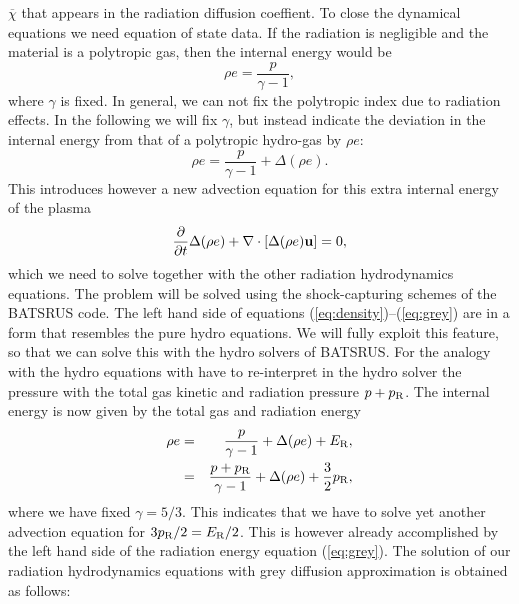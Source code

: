 \documentclass[12pt]{article}
\begin{document}
$\overline{\chi}$ that appears in the radiation diffusion coeffient.  
To close the dynamical equations we need equation of state data. 
If the radiation is negligible and the material is a polytropic gas, 
then the internal energy would be 
\begin{equation} 
\rho e = \frac{p}{\gamma - 1}, 
\end{equation} 
where $\gamma$ is fixed. In general, we can not fix the polytropic index due 
to radiation effects. In the following we will fix $\gamma$, but instead  
indicate the deviation in the internal energy from that of a polytropic 
hydro-gas by $\rho e$: 
\begin{equation} 
\rho e = \frac{p}{\gamma - 1} + \Delta (\rho e). 
\end{equation} 
This introduces however a new advection equation for this extra internal 
energy of the plasma 
\begin{equation} 
\frac{\partial}{\partial t} \Delta(\rho e) + \nabla\cdot\left[  
\Delta(\rho e) {\bf u} \right] = 0, 
\end{equation} 
which we need to solve together with the other radiation hydrodynamics 
equations.  The problem will be solved using the shock-capturing schemes of 
the BATSRUS code. The left hand side of equations 
(\ref{eq:density})--(\ref{eq:grey}) are in a form that resembles the pure 
hydro equations. We will fully exploit this feature, so that we can solve 
this with the hydro solvers of BATSRUS. For the analogy with the hydro 
equations with have to re-interpret in the hydro solver the pressure with 
the total gas kinetic and radiation pressure $p+p_{\rm R}$. The internal 
energy is now given by the total gas and radiation energy 
\begin{eqnarray} \rho e &=& \frac{p}{\gamma - 1} + \Delta (\rho e) + 
E_{\rm R}, \nonumber \\        
&=& \frac{p+p_{\rm R}}{\gamma - 1} + \Delta (\rho e) + \frac{3}{2}p_{\rm R}, 
\end{eqnarray} 
where we have fixed $\gamma=5/3$. This indicates that we have to solve yet 
another advection equation for $3p_{\rm R}/2=E_{\rm R}/2$. This is however 
already accomplished by the left hand side of the radiation energy equation 
(\ref{eq:grey}).  The solution of our radiation hydrodynamics equations with 
grey diffusion approximation is obtained as follows: 
\end{document}
